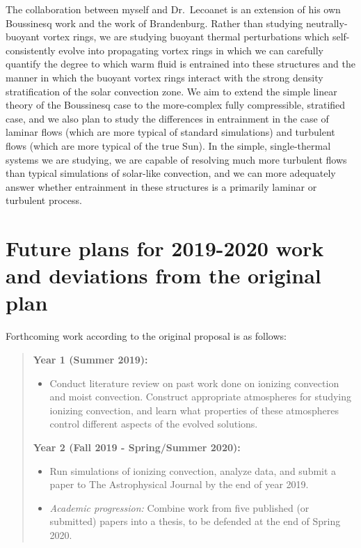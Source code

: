 \documentclass[aasms,12pt]{article}
\begin{document}
The collaboration between myself and Dr.~Lecoanet is an extension of his own Boussinesq work
and the work of Brandenburg. Rather than studying neutrally-buoyant vortex rings, we are studying
buoyant thermal perturbations which self-consistently evolve into propagating vortex rings
in which we can carefully quantify the degree to which warm fluid is entrained into these
structures and the manner in which the buoyant vortex rings interact with the strong
density stratification of the solar convection zone. We aim to extend the simple linear theory
of the Boussinesq case to the more-complex fully compressible, stratified case, and we also
plan to study the differences in entrainment in the case of laminar flows (which are more
typical of standard simulations) and turbulent flows (which are more typical of the true
Sun). In the simple, single-thermal systems we are studying, we are capable of resolving
much more turbulent flows than typical simulations of solar-like convection, and we can more
adequately answer whether entrainment in these structures is a primarily laminar or turbulent
process.

\section{Future plans for 2019-2020 work and deviations from the original plan}
\label{sec:future_plans}
Forthcoming work according to the original proposal is as follows:

\begin{quote}
\textbf{Year 1 (Summer 2019):}
\begin{itemize}
\item Conduct literature review on past work done on ionizing convection and moist convection.
Construct appropriate atmospheres for studying ionizing convection, and learn what properties of
these atmospheres control different aspects of the evolved solutions.
\end{itemize}

\vspace{-0.2cm}
\noindent
\textbf{Year 2 (Fall 2019 - Spring/Summer 2020):}
\begin{itemize}
\vspace{-0.2cm}
\item Run simulations of ionizing convection, analyze data, and submit a paper to The
Astrophysical Journal by the end of year 2019.
\vspace{-0.2cm}
\item \emph{Academic progression:} Combine work from five published (or submitted) papers into a thesis, to be defended at the end of 
Spring 2020.
\end{itemize}
\end{quote}
\end{document}
